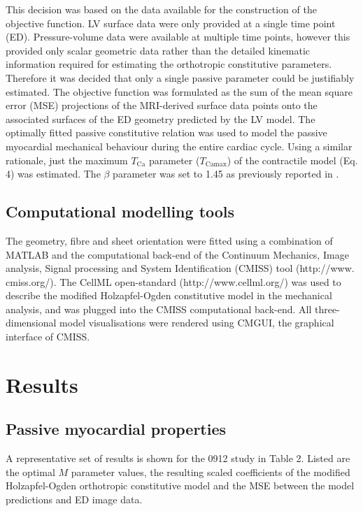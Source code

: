 \documentclass{llncs}
\begin{document}
This decision was based on the data available for the construction of the objective function. LV surface data were only provided at a single time point (ED). Pressure-volume data were available at multiple time points, however this provided only scalar geometric data rather than the detailed kinematic information required for estimating the orthotropic constitutive parameters. Therefore it was decided that only a single passive parameter could be justifiably estimated. The objective function was formulated as the sum of the mean square error (MSE) projections of the MRI-derived surface data points onto the associated surfaces of the ED geometry predicted by the LV model.  The optimally fitted passive constitutive relation was used to model the passive myocardial mechanical behaviour during the entire cardiac cycle.  Using a similar rationale, just the maximum $T_{\mathrm{Ca}}$ parameter ($T_{\mathrm{Camax}}$) of the contractile model (Eq. 4) was estimated. The $\beta$ parameter was set to 1.45 as previously reported in \cite{Hunter}.

\subsection{Computational modelling tools}
The geometry, fibre and sheet orientation were fitted using a combination of MATLAB and the computational back-end of the Continuum Mechanics, Image analysis, Signal processing and System Identification (CMISS) tool (http://www. cmiss.org/). The CellML open-standard (http://www.cellml.org/) was used to describe the modified Holzapfel-Ogden constitutive model in the mechanical analysis, and was plugged into the CMISS computational back-end. All three-dimensional model visualisations were rendered using CMGUI, the graphical interface of CMISS.  

\section{Results}

\subsection{Passive myocardial properties}
A representative set of results is shown for the 0912 study in Table 2. Listed are the optimal $M$ parameter values, the resulting scaled coefficients of the modified Holzapfel-Ogden orthotropic constitutive model and the MSE between the model predictions and ED image data. 
\end{document}
